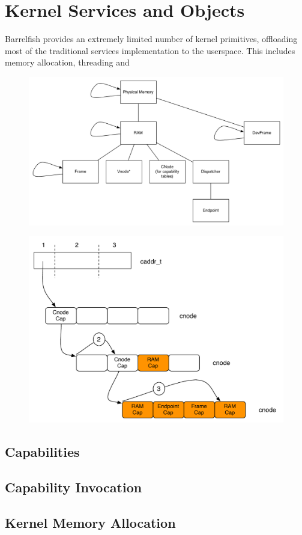 \documentclass[a4paper,twoside,openright]{report}
\begin{document}
\chapter{Kernel Services and Objects}
Barrelfish provides an extremely limited number of kernel primitives, offloading most of the traditional services implementation to the userspace.
This includes memory allocation, threading and 
\begin{figure}
	\centering
	\includegraphics[width=0.7\linewidth]{assets/cap_heirarchy}
	\caption{}
	\label{fig:capheirarchy}
\end{figure}
\begin{figure}
	\centering
	\includegraphics[width=0.7\linewidth]{assets/cap_translation}
	\caption{}
	\label{fig:captranslation}
\end{figure}

\section{Capabilities}
\section{Capability Invocation}
\section{Kernel Memory Allocation}
\end{document}
